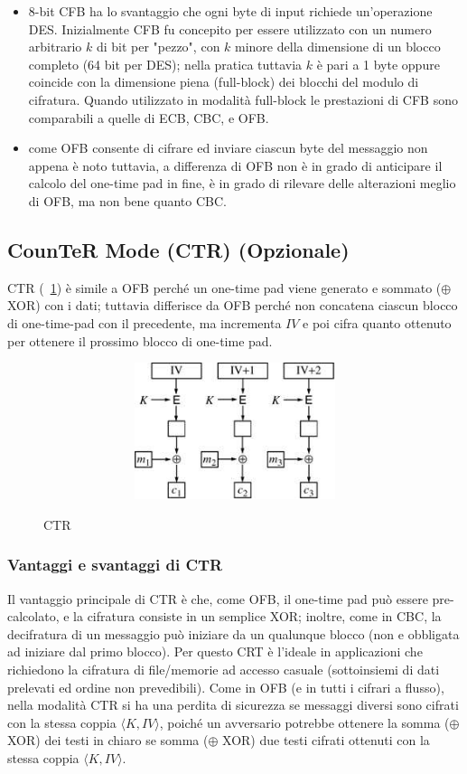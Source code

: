 \begin{itemize}
\item 8-bit CFB ha lo svantaggio che ogni byte di input richiede un'operazione DES. Inizialmente CFB fu concepito per essere utilizzato con un numero arbitrario $k$ di bit per "pezzo", con $k$ minore della dimensione di un blocco completo (64 bit per DES); nella pratica tuttavia $k$ è pari a 1 byte oppure coincide con la dimensione piena (full-block) dei blocchi del modulo di cifratura. Quando utilizzato in modalità full-block le prestazioni di CFB sono comparabili a quelle di ECB, CBC, e OFB.
\item come OFB consente di cifrare ed inviare ciascun byte del messaggio non appena è noto tuttavia, a differenza di OFB non è in grado di anticipare il calcolo del one-time pad in fine, è in grado di rilevare delle alterazioni meglio di OFB, ma non bene quanto CBC.
\end{itemize}
\subsection{CounTeR Mode (CTR) (Opzionale)}
CTR (\figurename ~\ref{fig:CTR}) è simile a OFB perché un one-time pad viene generato e sommato ($\oplus$ XOR) con i dati; tuttavia differisce da OFB perché non concatena ciascun blocco di one-time-pad con il precedente, ma incrementa $IV$ e poi cifra quanto ottenuto per ottenere il prossimo blocco di one-time pad. 
\begin{figure}[htbp]
	\centering%
	\subfigure%
	{\includegraphics[height=4cm, width=12cm, keepaspectratio]{Immagini/modalita_operative/CTR.png}}
	\caption{CTR \label{fig:CTR}} 	
\end{figure}
\subsubsection{Vantaggi e svantaggi di CTR}
Il vantaggio principale di CTR è che, come OFB, il one-time pad può essere pre-calcolato, e la cifratura consiste in un semplice XOR; inoltre, come in CBC, la decifratura di un messaggio può iniziare da un qualunque blocco (non e obbligata ad iniziare dal primo blocco). Per questo CRT è l'ideale in applicazioni che richiedono la cifratura di file/memorie ad accesso casuale (sottoinsiemi di dati prelevati ed ordine non prevedibili).\newline \newline
Come in OFB (e in tutti i cifrari a flusso), nella modalità CTR si ha una perdita di sicurezza se messaggi diversi sono cifrati con la stessa coppia $\langle K, IV \rangle$, poiché un avversario potrebbe ottenere la somma ($\oplus$ XOR) dei testi in chiaro se somma ($\oplus$ XOR) due testi cifrati ottenuti con la stessa coppia $\langle K, IV \rangle$.


